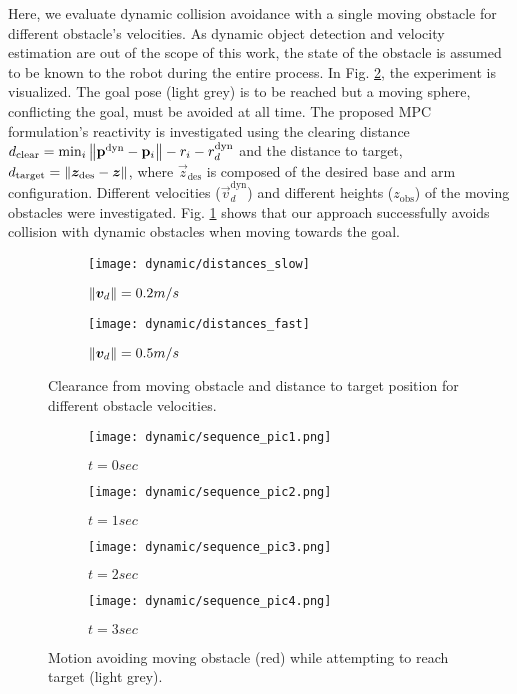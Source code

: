 Here, we evaluate dynamic collision avoidance with a single moving obstacle for different obstacle's velocities. As dynamic object detection and velocity estimation are out of the scope of this work, the state of the obstacle is assumed to be known to the robot during the entire process. In Fig. \ref{fig:dynamic_case}, the experiment is visualized. The goal pose (light grey) is to be reached but a moving sphere, conflicting the goal, must be avoided at all time. 
The proposed MPC formulation's reactivity is investigated using the clearing distance $d_{\textrm{clear}} = \min_i{\left\lVert\mathbf{p}^{\textrm{dyn}} - \mathbf{p}_{i}\right\rVert - r_i - r_d^{\textrm{dyn}}}$ and the distance to target, $d_{\textrm{target}} = \left\lVert\bm{z}_{\textrm{des}} - \bm{z}\right\rVert$, where $\vec{z}_{\textrm{des}}$ is composed of the desired base and arm configuration. Different velocities ($\vec{v}_d^{\textrm{dyn}}$) and different heights ($z_{\textrm{obs}}$) of the moving obstacles were investigated. Fig. \ref{fig:dynamic_distances} shows that our approach successfully avoids collision with dynamic obstacles when moving towards the goal. 
%
\begin{figure}[ht]
  \centering
  \begin{subfigure}[b]{0.4\linewidth}
    \texttt{[image: dynamic/distances\_slow]}
        \caption{$\left\lVert\bm{v}_d\right\rVert = 0.2m/s$}
  \end{subfigure}
  \begin{subfigure}[b]{0.4\linewidth}
    \texttt{[image: dynamic/distances\_fast]}
    \caption{$\left\lVert\bm{v}_d\right\rVert = 0.5m/s$}
  \end{subfigure}
  \caption{Clearance from moving obstacle and distance to target position for different obstacle velocities.}%
  \label{fig:dynamic_distances}
\end{figure}
%
\begin{figure}[ht]
  \centering
  \begin{subfigure}[b]{0.23\linewidth}
    \texttt{[image: dynamic/sequence\_pic1.png]}
    \caption{$t=0sec$}
  \end{subfigure}
  \begin{subfigure}[b]{0.23\linewidth}
    \texttt{[image: dynamic/sequence\_pic2.png]}
    \caption{$t=1sec$}
  \end{subfigure}
  \begin{subfigure}[b]{0.23\linewidth}
    \texttt{[image: dynamic/sequence\_pic3.png]}
    \caption{$t=2sec$}
  \end{subfigure}
  \begin{subfigure}[b]{0.23\linewidth}
    \texttt{[image: dynamic/sequence\_pic4.png]}
    \caption{$t=3sec$}
  \end{subfigure}
  \caption{Motion avoiding moving obstacle (red) while attempting to reach target (light grey).}%
  \label{fig:dynamic_case}
\end{figure}
%
